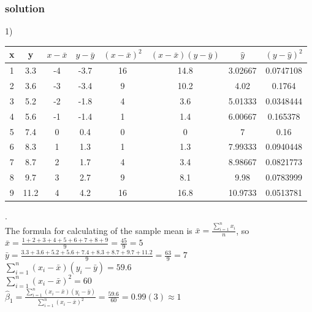 \documentclass[a4paper,12pt,titlepage]{article} %
\begin{document}
\subsubsection{solution}
1)\\
  \begin{tabular}{|c|c|c|c|c|c|c|c|}
    \hline
    x & y & $ x - \bar{x} $ & $ y - \bar{y} $ & $ (x - \bar{x})^{2} $ & $ (x - \bar{x})(y - \bar{y}) $ & $ \hat{y} $ & $ (y - \hat{y})^2 $ \\
    \hline
    1	& 3.3 	& -4	& -3.7	& 16	& 14.8	& 3.02667	& 0.0747108	\\
    \hline
    2	& 3.6	& -3	& -3.4	& 9	& 10.2	& 4.02  	& 0.1764	\\
    \hline
    3	& 5.2	& -2	& -1.8	& 4	& 3.6	& 5.01333	& 0.0348444	\\
    \hline
    4	& 5.6	& -1	& -1.4	& 1	& 1.4	& 6.00667	& 0.165378	\\
    \hline
    5	& 7.4	& 0	& 0.4	& 0	& 0	& 7     	& 0.16  	\\
    \hline
    6	& 8.3	& 1	& 1.3	& 1	& 1.3	& 7.99333	& 0.0940448	\\
    \hline
    7	& 8.7	& 2	& 1.7	& 4	& 3.4	& 8.98667	& 0.0821773	\\
    \hline
    8	& 9.7	& 3	& 2.7	& 9	& 8.1	& 9.98  	& 0.0783999	\\
    \hline
    9	& 11.2	& 4	& 4.2	& 16	& 16.8	& 10.9733	& 0.0513781	\\
    \hline
  \end{tabular}
.\\

The formula for calculating of the sample mean is $ \bar{x} = \frac{\sum_{i=1}^{n} x_{i}}{n} $, so \\

$\bar{x} = \frac{1 + 2 + 3 + 4 + 5 + 6 + 7 + 8 + 9 }{9} = \frac {45}{9} = 5 $ \\

$\bar{y} = \frac{3.3+3.6+5.2+5.6+7.4+8.3+8.7+9.7+11.2}{9} = \frac {63}{9} = 7 $ \\

$ \sum_{i=1}^{n} (x_{i}-\bar{x}) (y_{i}-\bar{y}) = 59.6 $ \\

$ \sum_{i=1}^{n} (x_{i}-\bar{x})^{2} = 60 $ \\

$ \hat{\beta}_{1} = \frac{\sum_{i=1}^{n} (x_{i}-\bar{x}) (y_{i}-\bar{y})}{ \sum_{i=1}^{n} (x_{i}-\bar{x})^{2} } = \frac{59.6}{60} = 0.99(3) \approx 1 $ \\
\end{document}
